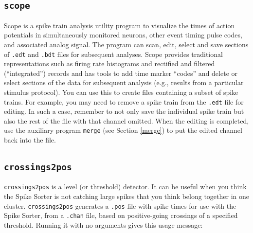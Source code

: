\documentclass[12pt]{article}
\begin{document}
\subsection{\tt scope}

Scope is a spike train analysis utility program to visualize the times
of action potentials in simultaneously monitored neurons, other event
timing pulse codes, and associated analog signal. The program can
scan, edit, select and save sections of {\tt .edt} and {\tt .bdt}
files for subsequent analyses. Scope provides traditional
representations such as firing rate histograms and rectified and
filtered (``integrated'') records and has tools to add time marker
``codes'' and delete or select sections of the data for subsequent
analysis (e.g., results from a particular stimulus protocol). You can
use this to create files containing a subset of spike trains. For
example, you may need to remove a spike train from the {\tt .edt} file
for editing. In such a case, remember to not only save the individual
spike train but also the rest of the file with that channel
omitted. When the editing is completed, use the auxiliary program
\texttt{merge} (see Section \ref{merge}) to put the edited channel
back into the file.

\subsection{\tt crossings2pos}

{\tt crossings2pos} is a level (or threshold) detector. It can be
useful when you think the Spike Sorter is not catching large spikes
that you think belong together in one cluster. {\tt crossings2pos}
generates a {\tt .pos} file with spike times for use with the Spike
Sorter, from a {\tt .chan} file, based on positive-going crossings of
a specified threshold. Running it with no arguments gives this usage
message:

\end{document}
